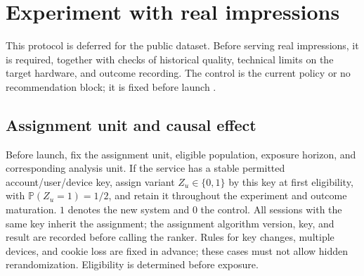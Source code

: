 \documentclass[12pt,a4paper]{article}
\newcommand{\Prob}{\mathbb P}
\theoremstyle{plainru}
\begin{document}
\section{Experiment with real impressions}\label{sec:eval-online}

This protocol is deferred for the public dataset. Before serving real impressions,
it is required, together with checks of historical quality, technical
limits on the target hardware, and outcome recording. The control is
the current policy or no recommendation block; it is fixed
before launch \cite{experiments}.

\subsection{Assignment unit and causal effect}\label{sec:eval-itt}

Before launch, fix the assignment unit, eligible population,
exposure horizon, and corresponding analysis unit.
If the service has a stable permitted account/user/device key,
assign variant $Z_u\in\{0,1\}$ by this key at first eligibility,
with $\Prob(Z_u=1)=1/2$, and retain it throughout the experiment and outcome maturation.
$1$ denotes the new system and $0$ the control. All sessions with the same key
inherit the assignment; the assignment algorithm version, key, and result
are recorded before calling the ranker. Rules for key changes, multiple
devices, and cookie loss are fixed in advance; these cases must not allow
hidden rerandomization. Eligibility is determined before exposure.
\end{document}
